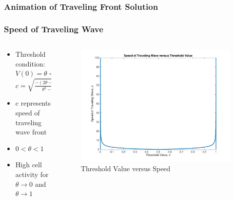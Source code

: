 \documentclass{beamer}
\begin{document}
\begin{frame}
\frametitle{Animation of Traveling Front Solution}
\end{frame}

\begin{frame}
\frametitle{Speed of Traveling Wave}
\begin{columns}
\begin{column}{.5\textwidth}
\begin{itemize}
	\item Threshold condition: $V(0)=\theta \Rightarrow$\\$c=\sqrt{\frac{-(2\theta-1)^2}{\theta^2-\theta}}$
	\item c represents speed of traveling wave front
	\item $0<\theta<1$
	\item High cell activity for $\theta\rightarrow0$ and $\theta\rightarrow1$
\end{itemize}
\end{column}
\begin{column}{.6\textwidth}
\begin{figure}
\includegraphics[scale=0.17]{thresholdSpeed1}
\caption{Threshold Value versus Speed}
\end{figure}
\end{column}
\end{columns}
\end{frame}
\end{document}
